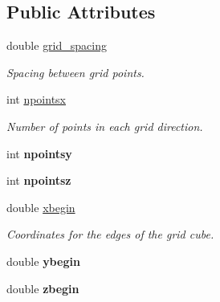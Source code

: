 \subsection*{Public Attributes}
\begin{DoxyCompactItemize}
\item 
\hypertarget{classGrid_a638c9f2eb29ed1fa21461791d9d542ee}{
double \hyperlink{classGrid_a638c9f2eb29ed1fa21461791d9d542ee}{grid\_\-spacing}}
\label{classGrid_a638c9f2eb29ed1fa21461791d9d542ee}

\begin{DoxyCompactList}\small\item\em Spacing between grid points. \item\end{DoxyCompactList}\item 
\hypertarget{classGrid_ad919203953732afb942d4527a309d589}{
int \hyperlink{classGrid_ad919203953732afb942d4527a309d589}{npointsx}}
\label{classGrid_ad919203953732afb942d4527a309d589}

\begin{DoxyCompactList}\small\item\em Number of points in each grid direction. \item\end{DoxyCompactList}\item 
\hypertarget{classGrid_ae1fa0b32f9098fc7592a7f2d6479db95}{
int {\bfseries npointsy}}
\label{classGrid_ae1fa0b32f9098fc7592a7f2d6479db95}

\item 
\hypertarget{classGrid_aac592f2a86e90be98e33106e87f48805}{
int {\bfseries npointsz}}
\label{classGrid_aac592f2a86e90be98e33106e87f48805}

\item 
\hypertarget{classGrid_a03901f92aadcf98e4a8c6d6b8b8370d7}{
double \hyperlink{classGrid_a03901f92aadcf98e4a8c6d6b8b8370d7}{xbegin}}
\label{classGrid_a03901f92aadcf98e4a8c6d6b8b8370d7}

\begin{DoxyCompactList}\small\item\em Coordinates for the edges of the grid cube. \item\end{DoxyCompactList}\item 
\hypertarget{classGrid_a7778a21d217d72b3710e10f960a94927}{
double {\bfseries ybegin}}
\label{classGrid_a7778a21d217d72b3710e10f960a94927}

\item 
\hypertarget{classGrid_a6239d160ae58def13731822899d296c9}{
double {\bfseries zbegin}}
\label{classGrid_a6239d160ae58def13731822899d296c9}


\end{DoxyCompactItemize}
